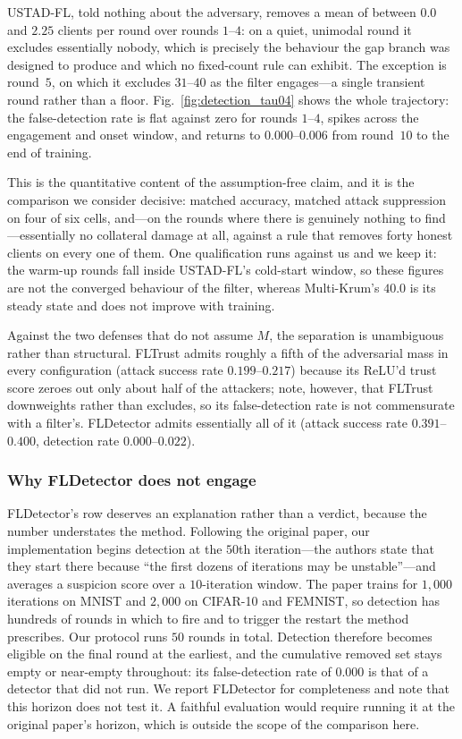 \documentclass[journal]{IEEEtran}
\begin{document}
USTAD-FL, told nothing about the adversary, removes a mean of between $0.0$ and $2.25$ clients
per round over rounds $1$--$4$: on a quiet, unimodal round it excludes essentially nobody,
which is precisely the behaviour the gap branch was designed to produce and which no
fixed-count rule can exhibit. The exception is round~$5$, on which it excludes $31$--$40$ as
the filter engages---a single transient round rather than a floor. Fig.~\ref{fig:detection_tau04}
shows the whole trajectory: the false-detection rate is flat against zero for rounds $1$--$4$,
spikes across the engagement and onset window, and returns to $0.000$--$0.006$ from round~$10$
to the end of training.

This is the quantitative content of the assumption-free claim, and it is the comparison we
consider decisive: matched accuracy, matched attack suppression on four of six cells, and---on
the rounds where there is genuinely nothing to find---essentially no collateral damage at all,
against a rule that removes forty honest clients on every one of them. One qualification runs
against us and we keep it: the warm-up rounds fall inside USTAD-FL's cold-start window, so
these figures are not the converged behaviour of the filter, whereas Multi-Krum's $40.0$ is
its steady state and does not improve with training.

Against the two defenses that do not assume $M$, the separation is unambiguous rather than
structural. FLTrust admits roughly a fifth of the adversarial mass in every configuration
(attack success rate $0.199$--$0.217$) because its ReLU'd trust score zeroes out only about
half of the attackers; note, however, that FLTrust downweights rather than excludes, so its
false-detection rate is not commensurate with a filter's. FLDetector admits essentially all
of it (attack success rate $0.391$--$0.400$, detection rate $0.000$--$0.022$).

\subsubsection{Why FLDetector does not engage}
FLDetector's row deserves an explanation rather than a verdict, because the number understates
the method. Following the original paper, our implementation begins detection at the $50$th
iteration---the authors state that they start there because ``the first dozens of iterations
may be unstable''---and averages a suspicion score over a $10$-iteration window. The paper
trains for $1{,}000$ iterations on MNIST and $2{,}000$ on CIFAR-10 and FEMNIST, so detection
has hundreds of rounds in which to fire and to trigger the restart the method prescribes. Our
protocol runs $50$ rounds in total. Detection therefore becomes eligible on the final round
at the earliest, and the cumulative removed set stays empty or near-empty throughout: its
false-detection rate of $0.000$ is that of a detector that did not run.
We report FLDetector for completeness and note that this horizon does not test it. A
faithful evaluation would require running it at the original paper's horizon, which is
outside the scope of the comparison here.
\end{document}
